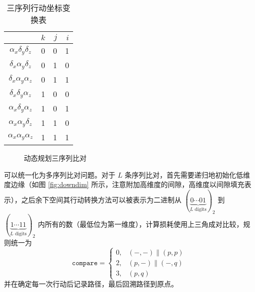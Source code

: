     \begin{minipage}{0.48\textwidth}
        \begin{table}[H]
            \centering
            \caption{三序列行动坐标变换表}\label{tab:multiple}
            \begin{tabular}{crrr}
                \toprule
                    & $k$ & $j$ & $i$ \\
                \midrule
                $\alpha_x\delta_y\delta_z$  & 0 & 0 & 1\\
                $\delta_x\alpha_y\delta_z$ & 0 & 1 & 0 \\
                $\delta_x\alpha_y\alpha_z$ & 0 & 1 & 1 \\
                $\delta_x\delta_y\alpha_z$ & 1 & 0 & 0 \\
                $\alpha_x\delta_y\alpha_z$ & 1 & 0 & 1 \\
                $\alpha_x\alpha_y\delta_z$ & 1 & 1 & 0 \\
                $\alpha_x\alpha_y\alpha_z$ & 1 & 1 & 1 \\
                \bottomrule
            \end{tabular}
        \end{table}
    \end{minipage}\hfil
    \begin{minipage}{0.48\textwidth}
        \begin{figure}[H]
            \centering
            
            \caption{动态规划三序列比对}\label{fig:multipledp}
        \end{figure}
    \end{minipage}
    \medskip

    可以统一化为多序列比对问题。对于 $L$ 条序列比对，首先需要递归地初始化低维度边缘（如图 \ref{fig:downdim} 所示，注意附加高维度的间隙，高维度以间隙填充表示），之后余下空间其行动转换方法可以被表示为二进制从 $(\underbrace{0\cdots01}_{L\text{ digits}})_2$ 到 $(\underbrace{1\cdots11}_{L\text{ digits}})_2$ 内所有的数（最低位为第一维度），计算损耗使用上三角成对比较，规则统一为
    \begin{equation*}
        \texttt{compare}=
        \begin{cases}
            0,& (-,-) \| (p,p) \\
            2,& (p,-) \| (-,q) \\
            3,& (p,q)
        \end{cases}
    \end{equation*}
    并在确定每一次行动后记录路径，最后回溯路径到原点。


